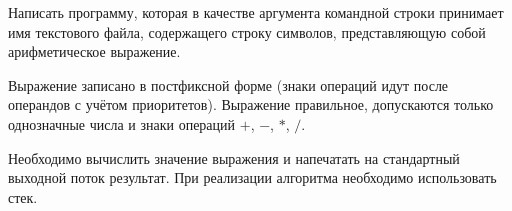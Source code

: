 

Написать программу, которая в качестве аргумента командной строки
принимает имя текстового файла, содержащего строку символов,
представляющую собой арифметическое выражение.

Выражение записано
в постфиксной форме (знаки операций идут после операндов с учётом
приоритетов). Выражение правильное, допускаются только однозначные
числа и знаки операций $+$, $-$, $*$, $/$.

Необходимо вычислить значение
выражения и напечатать на стандартный выходной поток результат. При
реализации алгоритма необходимо использовать стек.
